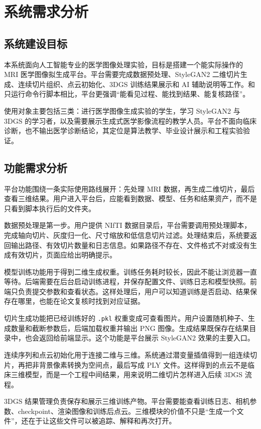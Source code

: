 \chapter{系统需求分析}

\section{系统建设目标}
本系统面向人工智能专业的医学图像处理实验，目标是搭建一个能实际操作的 MRI 医学图像拟生成平台。平台需要完成数据预处理、StyleGAN2 二维切片生成、连续切片组织、点云初始化、3DGS 训练结果展示和 AI 辅助说明等工作。和只运行命令行脚本相比，平台更强调“能看见过程、能找到结果、能复核路径”。

使用对象主要包括三类：进行医学图像生成实验的学生，学习 StyleGAN2 与 3DGS 的学习者，以及需要展示生成式医学影像流程的教学人员。平台不面向临床诊断，也不输出医学诊断结论，其定位是算法教学、毕业设计展示和工程实验验证。

\section{功能需求分析}
平台功能围绕一条实际使用路线展开：先处理 MRI 数据，再生成二维切片，最后查看三维结果。用户进入平台后，应能看到数据、模型、任务和结果资产，而不是只看到脚本执行后的文件夹。

数据预处理是第一步。用户提供 NIfTI 数据目录后，平台需要调用预处理脚本，完成轴向切片、灰度归一化、尺寸缩放和低信息切片过滤。处理结束后，系统要返回输出路径、有效切片数量和日志信息。如果路径不存在、文件格式不对或没有生成有效切片，页面应给出明确提示。

模型训练功能用于得到二维生成权重。训练任务耗时较长，因此不能让浏览器一直等待。后端需要在后台启动训练进程，并保存配置文件、训练日志和模型快照。前端只负责提交参数和查看状态。这样处理后，用户可以知道训练是否启动、结果保存在哪里，也能在论文复核时找到对应证据。

切片生成功能把已经训练好的 \texttt{.pkl} 权重变成可查看图片。用户设置随机种子、生成数量和截断参数后，后端加载权重并输出 PNG 图像。生成结果既保存在结果目录中，也会返回给前端显示。这个功能是平台展示 StyleGAN2 效果的主要入口。

连续序列和点云初始化用于连接二维与三维。系统通过潜变量插值得到一组连续切片，再把非背景像素转换为空间点，最后写成 PLY 文件。这样得到的点云不是临床三维模型，而是一个工程中间结果，用来说明二维切片怎样进入后续 3DGS 流程。

3DGS 结果管理负责保存和展示三维训练产物。平台需要能查看训练日志、相机参数、checkpoint、渲染图像和训练后点云。三维模块的价值不只是“生成一个文件”，还在于让这些文件可以被追踪、解释和再次打开。

